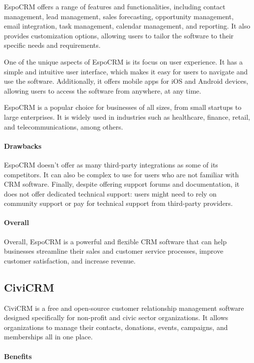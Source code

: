 \documentclass{article}
\begin{document}
EspoCRM offers a range of features and functionalities, including contact management, lead management, sales forecasting, opportunity management, email integration, task management, calendar management, and reporting. It also provides customization options, allowing users to tailor the software to their specific needs and requirements.

One of the unique aspects of EspoCRM is its focus on user experience. It has a simple and intuitive user interface, which makes it easy for users to navigate and use the software. Additionally, it offers mobile apps for iOS and Android devices, allowing users to access the software from anywhere, at any time.

EspoCRM is a popular choice for businesses of all sizes, from small startups to large enterprises. It is widely used in industries such as healthcare, finance, retail, and telecommunications, among others.

\paragraph{Drawbacks}

EspoCRM doesn't offer as many third-party integrations as some of its competitors. It can also be complex to use for users who are not familiar with CRM software. Finally, despite offering support forums and documentation, it does not offer dedicated technical support: users might need to rely on community support or pay for technical support from third-party providers.

\paragraph{Overall}


Overall, EspoCRM is a powerful and flexible CRM software that can help businesses streamline their sales and customer service processes, improve customer satisfaction, and increase revenue.

\subsection{CiviCRM}

 CiviCRM is a free and open-source customer relationship management software designed specifically for non-profit and civic sector organizations. It allows organizations to manage their contacts, donations, events, campaigns, and memberships all in one place. 

\paragraph{Benefits}
\end{document}

